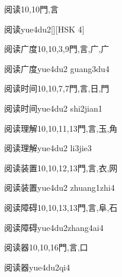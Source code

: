\begin{Entry}{阅读}{10,10}{⾨,⾔}
  \begin{Phonetics}{阅读}{yue4du2}[][HSK 4]
  \end{Phonetics}
\end{Entry}

\begin{Entry}{阅读广度}{10,10,3,9}{⾨,⾔,⼴,⼴}
  \begin{Phonetics}{阅读广度}{yue4du2 guang3du4}
  \end{Phonetics}
\end{Entry}

\begin{Entry}{阅读时间}{10,10,7,7}{⾨,⾔,⽇,⾨}
  \begin{Phonetics}{阅读时间}{yue4du2 shi2jian1}
  \end{Phonetics}
\end{Entry}

\begin{Entry}{阅读理解}{10,10,11,13}{⾨,⾔,⽟,⾓}
  \begin{Phonetics}{阅读理解}{yue4du2 li3jie3}
  \end{Phonetics}
\end{Entry}

\begin{Entry}{阅读装置}{10,10,12,13}{⾨,⾔,⾐,⽹}
  \begin{Phonetics}{阅读装置}{yue4du2 zhuang1zhi4}
  \end{Phonetics}
\end{Entry}

\begin{Entry}{阅读障碍}{10,10,13,13}{⾨,⾔,⾩,⽯}
  \begin{Phonetics}{阅读障碍}{yue4du2zhang4ai4}
  \end{Phonetics}
\end{Entry}

\begin{Entry}{阅读器}{10,10,16}{⾨,⾔,⼝}
  \begin{Phonetics}{阅读器}{yue4du2qi4}
  \end{Phonetics}
\end{Entry}

